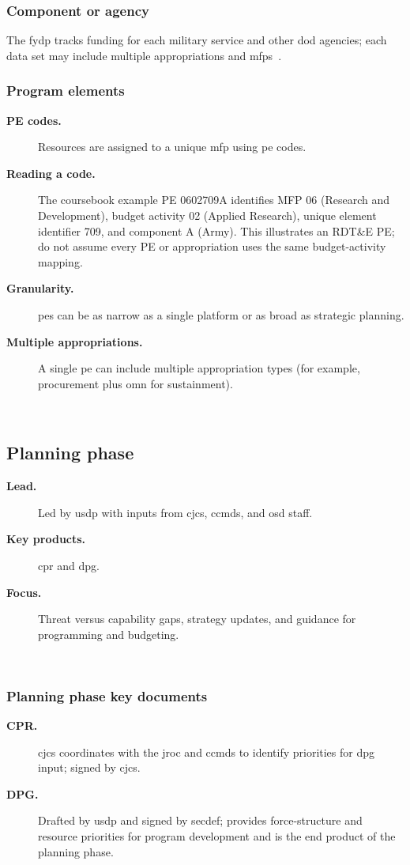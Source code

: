 \documentclass[../main.tex]{subfiles}
\begin{document}
\subsubsection{Component or agency}
The \ac{fydp} tracks funding for each military service and other \ac{dod} agencies; each data set may include multiple appropriations and \acp{mfp}~\autocite{edo-3-1-1-ppbe-2025}.

\subsubsection{Program elements}
\begin{description}
  \item[\textbf{PE codes.}] Resources are assigned to a unique \ac{mfp} using \ac{pe} codes.
  \item[\textbf{Reading a code.}] The coursebook example PE 0602709A identifies MFP 06 (Research and Development),
  budget activity 02 (Applied Research), unique element identifier 709, and component A (Army). This illustrates
  an RDT\&E PE; do not assume every PE or appropriation uses the same budget-activity mapping.
  \item[\textbf{Granularity.}] \acp{pe} can be as narrow as a single platform or as broad as strategic planning.
  \item[\textbf{Multiple appropriations.}] A single \ac{pe} can include multiple appropriation types (for example, procurement plus \ac{omn} for sustainment).
\end{description}
~

\subsection{Planning phase}
\begin{description}
  \item[\textbf{Lead.}] Led by \ac{usdp} with inputs from \ac{cjcs}, \acp{ccmd}, and \ac{osd} staff.
  \item[\textbf{Key products.}] \ac{cpr} and \ac{dpg}.
  \item[\textbf{Focus.}] Threat versus capability gaps, strategy updates, and guidance for programming and budgeting.
\end{description}
~

\subsubsection{Planning phase key documents}
\begin{description}
  \item[\textbf{CPR.}] \ac{cjcs} coordinates with the \ac{jroc} and \acp{ccmd} to identify priorities for \ac{dpg} input; signed by \ac{cjcs}.
  \item[\textbf{DPG.}] Drafted by \ac{usdp} and signed by \ac{secdef}; provides force-structure and resource priorities for program development and is the end product of the planning phase.
\end{description}
~
\end{document}
